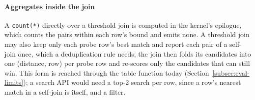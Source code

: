 \paragraph{Aggregates inside the join}
A \texttt{count(*)} directly over a threshold join is computed in the kernel's epilogue, which counts the pairs within each row's bound and emits none.
A threshold join may also keep only each probe row's best match and report each pair of a self-join once, which a deduplication rule needs; the join then folds its candidates into one (distance, row) per probe row and re-scores only the candidates that can still win.
This form is reached through the table function today (Section~\ref{subsec:eval-limits}); a search API would need a top-2 search per row, since a row's nearest match in a self-join is itself, and a filter.
